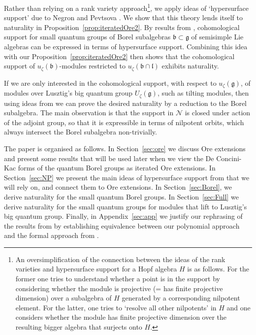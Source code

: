 \documentclass{amsart}
\numberwithin{equation}{section}
\theoremstyle{definition}
\theoremstyle{remark}
\newcommand{\cN}{\mathcal{N}}
\newcommand{\fg}{\mathfrak{g}}
\newcommand{\fb}{\mathfrak{b}}
\newcommand{\fl}{\mathfrak{l}}
\begin{document}
Rather than relying on a rank variety approach\footnote{An oversimplification of the connection between the ideas of the rank varieties and hypersurface support for a Hopf algebra $H$ is as follows. For the former one tries to understand whether a point is in the support by considering whether the module is projective (= has finite projective dimension) over a subalgebra of $H$ generated by a corresponding nilpotent element. For the latter, one tries to `resolve all other nilpotents' in $H$ and one considers whether the module has finite projective dimension over the resulting bigger algebra that surjects onto $H$.}, we apply ideas of `hypersurface support' due to Negron and Pevtsova \cite{NP1, NP2}. We show that this theory lends itself to naturality in Proposition~\ref{prop:iteratedOre2}. By results from \cite{NP2}, cohomological support for small quantum groups of Borel subalgebras $\fb\subset\fg$ of semisimple Lie algebras can be expressed in terms of hypersurface support. Combining this idea with our Proposition~\ref{prop:iteratedOre2} then shows that the cohomological support of $u_\zeta(\fb)$-modules restricted to $u_\zeta(\fb\cap\fl)$ exhibits naturality. 


If we are only interested in the cohomological support, with respect to $u_\zeta(\fg)$, of modules over Lusztig's big quantum group $U_\zeta(\fg)$, such as tilting modules, then using ideas from \cite{BKN} we can prove the desired naturality by a reduction to the Borel subalgebra. The main observation is that the support in $\cN$ is closed under action of the adjoint group, so that it is expressible in terms of nilpotent orbits, which always intersect the Borel subalgebra non-trivially.

The paper is organised as follows. In Section~\ref{sec:ore} we discuss Ore extensions and present some results that will be used later when we view the De Concini-Kac forms of the quantum Borel groups as iterated Ore extensions. In Section~\ref{sec:NP} we present the main ideas of hypersurface support from \cite{NP1, NP2} that we will rely on, and connect them to Ore extensions. In Section~\ref{sec:Borel}, we derive naturality for the small quantum Borel groups. In Section~\ref{sec:Full} we derive naturality for the small quantum groups for modules that lift to Lusztig's big quantum group. Finally, in Appendix~\ref{sec:app} we justify our rephrasing of the results from \cite{NP1, NP2} by establishing equivalence between our polynomial approach and the formal approach from \cite{NP1, NP2}.
\end{document}
